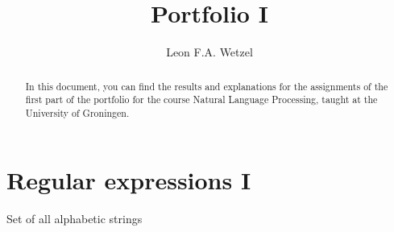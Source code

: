 \documentclass[a4paper, 11pt]{article}
\title{Portfolio I}
\author{Leon F.A. Wetzel}
\begin{document}
\maketitle

\begin{abstract}
	
	In this document, you can find the results and explanations for the assignments of the first part of the portfolio for the course Natural Language Processing, taught at the University of Groningen.

\end{abstract}

\section{Regular expressions I}

Set of all alphabetic strings
\end{document}
